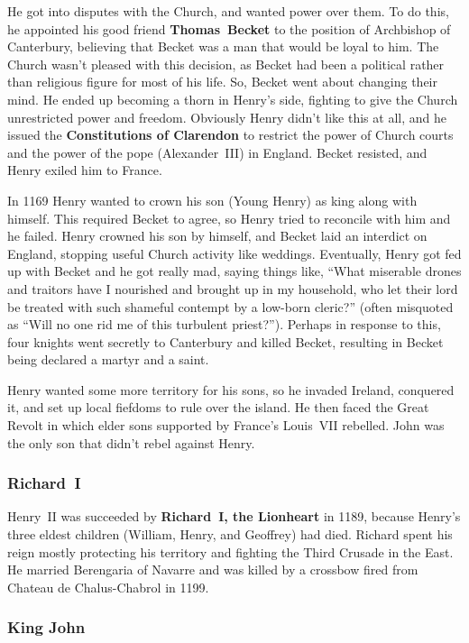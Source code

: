 He got into disputes with the Church, and wanted power over them.
To do this,
he appointed his good friend \textbf{Thomas~Becket} to the position of Archbishop of Canterbury,
believing that Becket was a man that would be loyal to him.
The Church wasn't pleased with this decision,
as Becket had been a political rather than religious figure for most of his life.
So, Becket went about changing their mind.
He ended up becoming a thorn in Henry's side,
fighting to give the Church unrestricted power and freedom.
Obviously Henry didn't like this at all,
and he issued the \textbf{Constitutions of Clarendon} to restrict the power of Church courts
and the power of the pope (Alexander~III) in England.
Becket resisted, and Henry exiled him to France.

In 1169 Henry wanted to crown his son (Young Henry) as king along with himself.
This required Becket to agree, so Henry tried to reconcile with him and he failed.
Henry crowned his son by himself, and Becket laid an interdict on England,
stopping useful Church activity like weddings.
Eventually, Henry got fed up with Becket and he got really mad, saying things like,
``What miserable drones and traitors have I nourished and brought up in my household,
who let their lord be treated with such shameful contempt by a low-born cleric?''
(often misquoted as ``Will no one rid me of this turbulent priest?'').
Perhaps in response to this, four knights went secretly to Canterbury and killed Becket,
resulting in Becket being declared a martyr and a saint.

Henry wanted some more territory for his sons, so he invaded Ireland, conquered it,
and set up local fiefdoms to rule over the island.
He then faced the Great Revolt in which elder sons supported by France's Louis~VII rebelled.
John was the only son that didn't rebel against Henry.

\subsubsection*{Richard~I}

Henry~II was succeeded by \textbf{Richard~I, the Lionheart} in 1189,
because Henry's three eldest children (William, Henry, and Geoffrey) had died.
Richard spent his reign mostly protecting his territory and fighting the Third Crusade in the East.
He married Berengaria of Navarre
and was killed by a crossbow fired from Chateau de Chalus-Chabrol in 1199.

\subsubsection*{King John}

